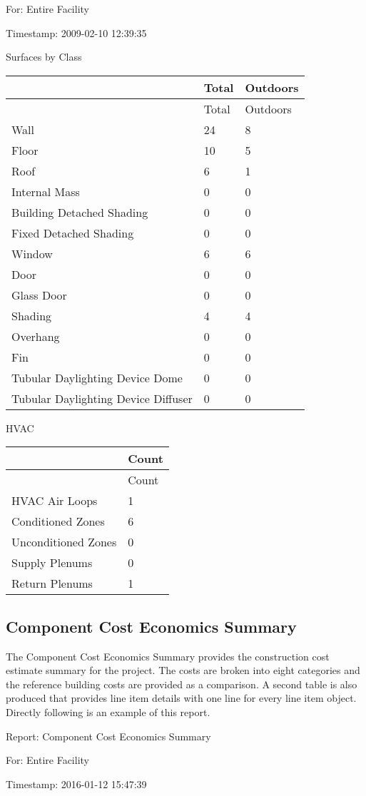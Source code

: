 For: Entire Facility

Timestamp: 2009-02-10 12:39:35

Surfaces by Class

\begin{longtable}[c]{@{}lll@{}}
\toprule 
~ & Total & Outdoors \tabularnewline
\midrule
\endfirsthead

\toprule 
~ & Total & Outdoors \tabularnewline
\midrule
\endhead

Wall & 24 & 8 \tabularnewline
Floor & 10 & 5 \tabularnewline
Roof & 6 & 1 \tabularnewline
Internal Mass & 0 & 0 \tabularnewline
Building Detached Shading & 0 & 0 \tabularnewline
Fixed Detached Shading & 0 & 0 \tabularnewline
Window & 6 & 6 \tabularnewline
Door & 0 & 0 \tabularnewline
Glass Door & 0 & 0 \tabularnewline
Shading & 4 & 4 \tabularnewline
Overhang & 0 & 0 \tabularnewline
Fin & 0 & 0 \tabularnewline
Tubular Daylighting Device Dome & 0 & 0 \tabularnewline
Tubular Daylighting Device Diffuser & 0 & 0 \tabularnewline
\bottomrule
\end{longtable}

HVAC

\begin{longtable}[c]{@{}ll@{}}
\toprule 
~ & Count \tabularnewline
\midrule
\endfirsthead

\toprule 
~ & Count \tabularnewline
\midrule
\endhead

HVAC Air Loops & 1 \tabularnewline
Conditioned Zones & 6 \tabularnewline
Unconditioned Zones & 0 \tabularnewline
Supply Plenums & 0 \tabularnewline
Return Plenums & 1 \tabularnewline
\bottomrule
\end{longtable}

\subsection{Component Cost Economics Summary}\label{component-cost-economics-summary}

The Component Cost Economics Summary provides the construction cost estimate summary for the project. The costs are broken into eight categories and the reference building costs are provided as a comparison. A second table is also produced that provides line item details with one line for every line item object. Directly following is an example of this report.

Report: Component Cost Economics Summary

For: Entire Facility

Timestamp: 2016-01-12 15:47:39

